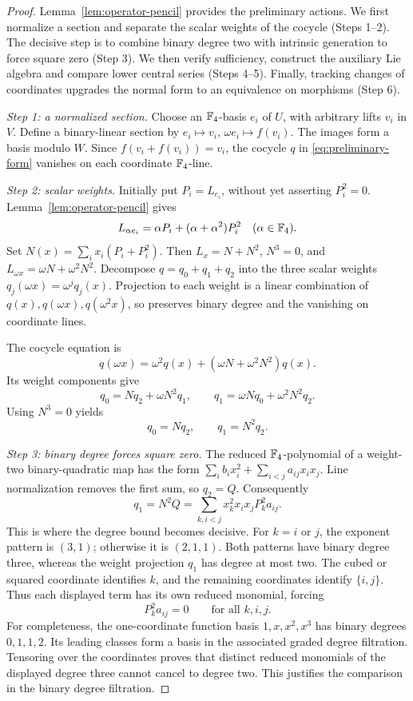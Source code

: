 \begin{proof}
Lemma~\ref{lem:operator-pencil} provides the preliminary actions.
We first normalize a section and separate the scalar weights of the
cocycle (Steps 1--2). The decisive step is to combine binary degree two
with intrinsic generation to force square zero (Step 3).
We then verify sufficiency, construct the auxiliary Lie algebra and
compare lower central series (Steps 4--5). Finally, tracking changes of
coordinates upgrades the normal form to an equivalence on morphisms
(Step 6).

\emph{Step 1: a normalized section.}
Choose an \(\mathbb F_4\)-basis \(e_i\) of \(U\), with arbitrary lifts \(v_i\)
in \(V\). Define a binary-linear section by
\(e_i\mapsto v_i\), \(\omega e_i\mapsto f(v_i)\).
The images form a basis modulo \(W\).
Since \(f(v_i+f(v_i))=v_i\), the cocycle \(q\) in
\eqref{eq:preliminary-form} vanishes on each coordinate \(\mathbb F_4\)-line.

\emph{Step 2: scalar weights.}
Initially put \(P_i=L_{e_i}\), without yet asserting \(P_i^2=0\).
Lemma~\ref{lem:operator-pencil} gives
\[
 L_{\alpha e_i}=\alpha P_i+(\alpha+\alpha^2)P_i^2
       \quad(\alpha\in\mathbb F_4).
\]
Set \(N(x)=\sum_i x_i(P_i+P_i^2)\).
Then \(L_x=N+N^2\), \(N^3=0\), and
\(L_{\omega x}=\omega N+\omega^2N^2\).
Decompose \(q=q_0+q_1+q_2\) into the three scalar weights
\(q_j(\omega x)=\omega^jq_j(x)\). Projection to each weight is a linear
combination of \(q(x),q(\omega x),q(\omega^2x)\), so preserves binary
degree and the vanishing on coordinate lines.

The cocycle equation is
\[
 q(\omega x)=\omega^2q(x)+(\omega N+\omega^2N^2)q(x).
\]
Its weight components give
\[
 q_0=Nq_2+\omega N^2q_1,\qquad
 q_1=\omega Nq_0+\omega^2N^2q_2.
\]
Using \(N^3=0\) yields
\begin{equation}\label{eq:weight-solution}
 q_0=Nq_2,\qquad q_1=N^2q_2.
\end{equation}

\emph{Step 3: binary degree forces square zero.}
The reduced \(\mathbb F_4\)-polynomial of a weight-two binary-quadratic map has
the form \(\sum_i b_ix_i^2+\sum_{i<j}a_{ij}x_ix_j\).
Line normalization removes the first sum, so \(q_2=Q\).
Consequently
\[
 q_1=N^2Q=\sum_{k,i<j}x_k^2x_ix_jP_k^2a_{ij}.
\]
This is where the degree bound becomes decisive. For \(k=i\) or \(j\),
the exponent pattern is \((3,1)\); otherwise it is \((2,1,1)\).
Both patterns have binary degree three, whereas the weight projection
\(q_1\) has degree at most two. The cubed or squared coordinate
identifies \(k\), and the remaining coordinates identify \(\{i,j\}\).
Thus each displayed term has its own reduced monomial, forcing
\begin{equation}\label{eq:squares-kill-coefficients}
 P_k^2a_{ij}=0\qquad\text{for all }k,i,j.
\end{equation}
For completeness, the one-coordinate function basis
\(1,x,x^2,x^3\) has binary degrees \(0,1,1,2\).
Its leading classes form a basis in the associated graded degree
filtration. Tensoring over the coordinates proves that distinct reduced
monomials of the displayed degree three cannot cancel to degree two.
This justifies the comparison in the binary degree filtration.


\end{proof}
